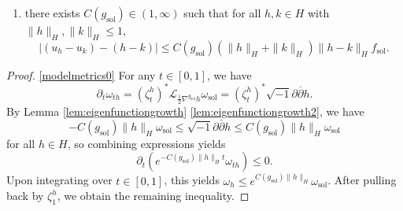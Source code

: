 \documentclass[10pt,a4paper]{amsart}
\providecommand{\sol}{\operatorname{sol}}
\begin{document}
\begin{prop}
\begin{enumerate}
\item \label{modelmetrics4} there exists $C(g_{\sol})\in (1,\infty)$ such that for all $h,k\in H$ with $\|h\|_H,\|k\|_H \leq 1$,
\begin{equation*}
    |(u_{h}-u_{k})-(h-k)| \leq C(g_{\sol})(\|h\|_H + \|k\|_H)\|h-k\|_H f_{\sol}.
\end{equation*}
\end{enumerate}
\end{prop}

\begin{proof} \ref{modelmetrics0}
For any $t\in [0,1]$, we have
\begin{equation*} \partial_t \omega_{th}=(\zeta_t^h)^{\ast}\mathcal{L}_{\frac{1}{2}\nabla^{g_{\sol}}h}\omega_{\sol}=(\zeta_t^h)^{\ast}\sqrt{-1}\partial \overline{\partial}h .\end{equation*}
By Lemma \ref{lem:eigenfunctiongrowth} \ref{lem:eigenfunctiongrowth2}, we have
\begin{equation*}
     -C(g_{\sol})\|h\|_H\omega_{\sol}\le \sqrt{-1}\partial\bar\partial h\le C(g_{\sol})\|h\|_H\omega_{\sol}
\end{equation*}
for all $h\in H$, so combining expressions yields 
\begin{equation*}
   \partial_t (e^{-C(g_{\sol})\|h\|_Ht}\omega_{th}) \leq 0.
\end{equation*}
Upon integrating over $t\in [0,1]$, this yields $\omega_h \leq e^{C(g_{\sol})\|h\|_H}\omega_{\sol}$. After pulling back by $\zeta_1^h$, we obtain the remaining inequality.  


\end{proof}
\end{document}
